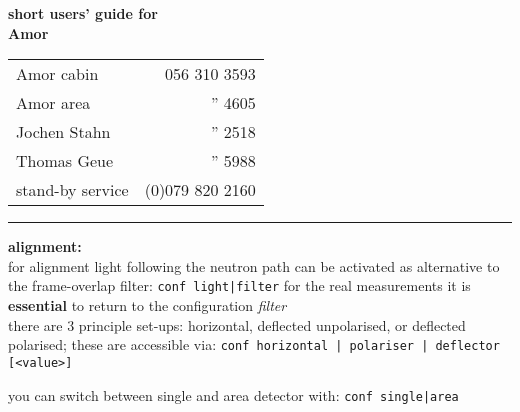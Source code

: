 \documentclass[10pt]{article}
\newcommand{\sclc}[1]{\newline\texttt{\color{blue}\phantom{xxx}#1}\newline }
\newcommand{\<}{$<$}
\renewcommand{\>}{\/$>$}
\begin{document}
\sf
\parbox[t]{80mm}{\textbf{\large short users' guide for \\[2ex] 
                          \Huge Amor}} \hfill
\parbox[t]{55mm}{
\begin{tabular}[t]{@{}lr}
 Amor cabin   & 056 310 3593 \\
 Amor area    & '' 4605 \\
 Jochen Stahn & '' 2518 \\
 Thomas Geue  & '' 5988 \\
 stand-by service & (0)079 820 2160
\end{tabular}}%

\rule{\textwidth}{0.8mm}

\vfill
\textbf{alignment:}\\[1mm]
for alignment {\color{red}light} following the neutron path can be activated
as alternative to the frame-overlap filter:
 \sclc{conf light|filter}
for the real measurements it is \textbf{essential} to return to the 
configuration \textsl{filter} \\

there are 3 principle set-ups: horizontal, deflected unpolarised, or 
 deflected polarised;
these are accessible via: 
 \sclc{conf horizontal | polariser | deflector [<value>]}

you can switch between single and area detector with:
 \sclc{conf single|area}
\end{document}
